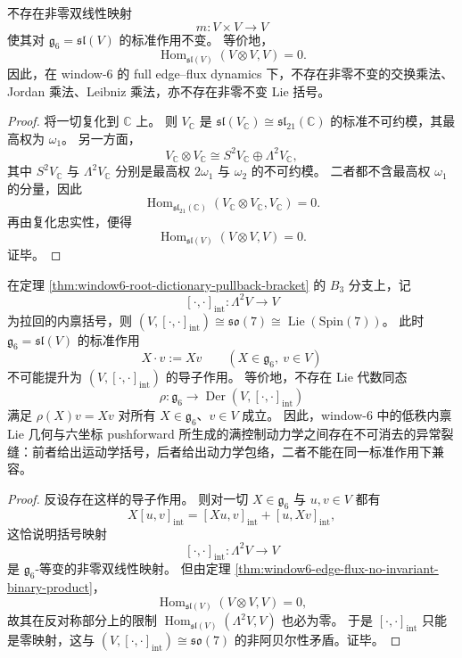 \begin{theorem}\label{thm:window6-edge-flux-no-invariant-binary-product}
不存在非零双线性映射
\[
m:V\times V\to V
\]
使其对 \(\mathfrak g_6=\mathfrak{sl}(V)\) 的标准作用不变。
等价地，
\[
\operatorname{Hom}_{\mathfrak{sl}(V)}(V\otimes V,V)=0.
\]
因此，在 window-\(6\) 的 full edge--flux dynamics 下，不存在非零不变的交换乘法、Jordan 乘法、Leibniz 乘法，亦不存在非零不变 Lie 括号。
\end{theorem}
\begin{proof}
将一切复化到 \(\mathbb C\) 上。
则 \(V_{\mathbb C}\) 是 \(\mathfrak{sl}(V_{\mathbb C})\cong \mathfrak{sl}_{21}(\mathbb C)\) 的标准不可约模，其最高权为 \(\omega_1\)。
另一方面，
\[
V_{\mathbb C}\otimes V_{\mathbb C}\cong S^2V_{\mathbb C}\oplus \Lambda^2V_{\mathbb C},
\]
其中 \(S^2V_{\mathbb C}\) 与 \(\Lambda^2V_{\mathbb C}\) 分别是最高权 \(2\omega_1\) 与 \(\omega_2\) 的不可约模。
二者都不含最高权 \(\omega_1\) 的分量，因此
\[
\operatorname{Hom}_{\mathfrak{sl}_{21}(\mathbb C)}(V_{\mathbb C}\otimes V_{\mathbb C},V_{\mathbb C})=0.
\]
再由复化忠实性，便得
\[
\operatorname{Hom}_{\mathfrak{sl}(V)}(V\otimes V,V)=0.
\]
证毕。
\end{proof}

\begin{corollary}\label{cor:window6-spin7-bracket-dynamic-anomaly}
在定理 \ref{thm:window6-root-dictionary-pullback-bracket} 的 \(B_3\) 分支上，记
\[
[\cdot,\cdot]_{\mathrm{int}}:\Lambda^2V\to V
\]
为拉回的内禀括号，则 \((V,[\cdot,\cdot]_{\mathrm{int}})\cong \mathfrak{so}(7)\cong \operatorname{Lie}(\mathrm{Spin}(7))\)。
此时 \(\mathfrak g_6=\mathfrak{sl}(V)\) 的标准作用
\[
X\cdot v:=Xv\qquad (X\in \mathfrak g_6,\ v\in V)
\]
不可能提升为 \((V,[\cdot,\cdot]_{\mathrm{int}})\) 的导子作用。
等价地，不存在 Lie 代数同态
\[
\rho:\mathfrak g_6\to \operatorname{Der}(V,[\cdot,\cdot]_{\mathrm{int}})
\]
满足 \(\rho(X)v=Xv\) 对所有 \(X\in \mathfrak g_6\)、\(v\in V\) 成立。
因此，window-\(6\) 中的低秩内禀 Lie 几何与六坐标 pushforward 所生成的满控制动力学之间存在不可消去的异常裂缝：前者给出运动学括号，后者给出动力学包络，二者不能在同一标准作用下兼容。
\end{corollary}
\begin{proof}
反设存在这样的导子作用。
则对一切 \(X\in \mathfrak g_6\) 与 \(u,v\in V\) 都有
\[
X[u,v]_{\mathrm{int}}=[Xu,v]_{\mathrm{int}}+[u,Xv]_{\mathrm{int}},
\]
这恰说明括号映射
\[
[\cdot,\cdot]_{\mathrm{int}}:\Lambda^2V\to V
\]
是 \(\mathfrak g_6\)-等变的非零双线性映射。
但由定理 \ref{thm:window6-edge-flux-no-invariant-binary-product}，
\[
\operatorname{Hom}_{\mathfrak{sl}(V)}(V\otimes V,V)=0,
\]
故其在反对称部分上的限制
\(
\operatorname{Hom}_{\mathfrak{sl}(V)}(\Lambda^2V,V)
\)
也必为零。
于是 \([\cdot,\cdot]_{\mathrm{int}}\) 只能是零映射，这与 \((V,[\cdot,\cdot]_{\mathrm{int}})\cong \mathfrak{so}(7)\) 的非阿贝尔性矛盾。证毕。
\end{proof}


